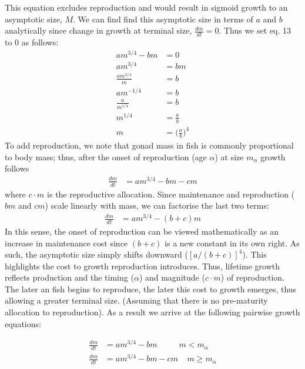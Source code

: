 \documentclass[a4paper]{article} %
\begin{document}
This equation excludes reproduction and would result in sigmoid growth to an asymptotic size, $M$. We can find find this asymptotic size in terms of $a$ and $b$ analytically since change in growth at terminal size, $\frac{dm}{dt} = 0$. Thus we set eq. 13 to 0 as follows:
\begin{align}
    am^{3/4} - bm &= 0 \\
    am^{3/4} &= bm \\
    \frac{am^{3/4}}{m} &= b \\
    am^{-1/4} &= b \\
    \frac{a}{m^{1/4}} &= b \\
    m^{1/4} &= \frac{a}{b} \\
    m &= \Big(\frac{a}{b}\Big)^4
\end{align}
To add reproduction, we note that gonad mass in fish is commonly proportional to body mass; thus, after the onset of reproduction (age $\alpha$) at size $m_{\alpha}$ growth follows
\begin{align}
    \frac{dm}{dt} &= am^{3/4} - bm - cm
\end{align}
where $c \cdot m$ is the reproductive allocation. Since maintenance and reproduction ($bm$ and $cm$) scale linearly with mass, we can factorise the last two terms:
\begin{align}
    \frac{dm}{dt} &= am^{3/4} - (b+c)m
\end{align}
In this sense, the onset of reproduction can be viewed mathematically as an increase in maintenance cost since $(b+c)$ is a new constant in its own right. As such, the asymptotic size simply shifts downward ($[a/(b+c)]^4$). This highlights the cost to growth reproduction introduces. Thus, lifetime growth reflects production and the timing ($\alpha$) and magnitude ($c\cdot{m}$) of reproduction. The later an fish begins to reproduce, the later this cost to growth emerges, thus allowing a greater terminal size. (Assuming that there is no pre-maturity allocation to reproduction). As a result we arrive at the following pairwise growth equations:

\begin{align}
    \frac{dm}{dt} &= am^{3/4} - bm \ \ \ \ \ \ \ \ \ \ \ \ m < m_{\alpha} \\
    \frac{dm}{dt} &= am^{3/4} - bm - cm \ \ \ \ \ m \geq m_{\alpha}
\end{align}
\end{document}
